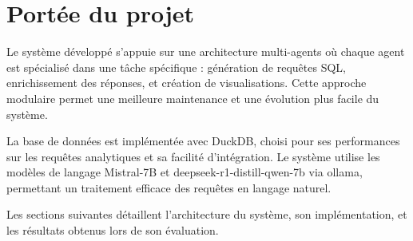 \section{Portée du projet}

Le système développé s'appuie sur une architecture multi-agents où chaque agent est spécialisé dans une tâche spécifique : génération de requêtes SQL, enrichissement des réponses, et création de visualisations. Cette approche modulaire permet une meilleure maintenance et une évolution plus facile du système.

La base de données est implémentée avec DuckDB, choisi pour ses performances sur les requêtes analytiques et sa facilité d'intégration. Le système utilise les modèles de langage Mistral-7B et deepseek-r1-distill-qwen-7b via ollama, permettant un traitement efficace des requêtes en langage naturel.

Les sections suivantes détaillent l'architecture du système, son implémentation, et les résultats obtenus lors de son évaluation.